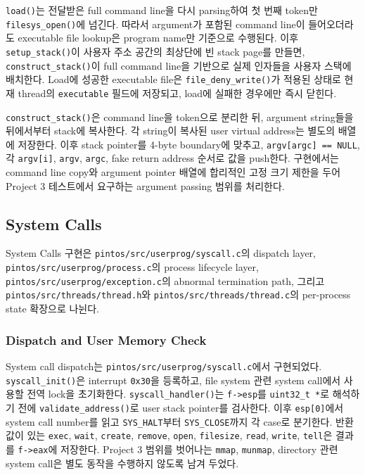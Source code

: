 \documentclass[conference]{IEEEtran}
\newcommand{\codefont}[1]{\texttt{\color{darkmagenta}#1}}
\begin{document}
\codefont{load()}는 전달받은 full command line을 다시 parsing하여 첫 번째 token만 \codefont{filesys\_open()}에 넘긴다. 따라서 argument가 포함된 command line이 들어오더라도 executable file lookup은 program name만 기준으로 수행된다. 이후 \codefont{setup\_stack()}이 사용자 주소 공간의 최상단에 빈 stack page를 만들면, \codefont{construct\_stack()}이 full command line을 기반으로 실제 인자들을 사용자 스택에 배치한다. Load에 성공한 executable file은 \codefont{file\_deny\_write()}가 적용된 상태로 현재 thread의 \codefont{executable} 필드에 저장되고, load에 실패한 경우에만 즉시 닫힌다.

\codefont{construct\_stack()}은 command line을 token으로 분리한 뒤, argument string들을 뒤에서부터 stack에 복사한다. 각 string이 복사된 user virtual address는 별도의 배열에 저장한다. 이후 stack pointer를 4-byte boundary에 맞추고, \codefont{argv[argc] == NULL}, 각 \codefont{argv[i]}, \codefont{argv}, \codefont{argc}, fake return address 순서로 값을 push한다. 구현에서는 command line copy와 argument pointer 배열에 합리적인 고정 크기 제한을 두어 Project 3 테스트에서 요구하는 argument passing 범위를 처리한다.

\subsection{System Calls}

System Calls 구현은 \codefont{pintos/src/userprog/syscall.c}의 dispatch layer, \codefont{pintos/src/userprog/process.c}의 process lifecycle layer, \codefont{pintos/src/userprog/exception.c}의 abnormal termination path, 그리고 \codefont{pintos/src/threads/thread.h}와 \codefont{pintos/src/threads/thread.c}의 per-process state 확장으로 나뉜다.

\subsubsection{Dispatch and User Memory Check}

System call dispatch는 \codefont{pintos/src/userprog/syscall.c}에서 구현되었다. \codefont{syscall\_init()}은 interrupt \codefont{0x30}을 등록하고, file system 관련 system call에서 사용할 전역 lock을 초기화한다. \codefont{syscall\_handler()}는 \codefont{f-\textgreater{}esp}를 \codefont{uint32\_t *}로 해석하기 전에 \codefont{validate\_address()}로 user stack pointer를 검사한다. 이후 \codefont{esp[0]}에서 system call number를 읽고 \codefont{SYS\_HALT}부터 \codefont{SYS\_CLOSE}까지 각 case로 분기한다. 반환값이 있는 \codefont{exec}, \codefont{wait}, \codefont{create}, \codefont{remove}, \codefont{open}, \codefont{filesize}, \codefont{read}, \codefont{write}, \codefont{tell}은 결과를 \codefont{f-\textgreater{}eax}에 저장한다. Project 3 범위를 벗어나는 \codefont{mmap}, \codefont{munmap}, directory 관련 system call은 별도 동작을 수행하지 않도록 남겨 두었다.
\end{document}

